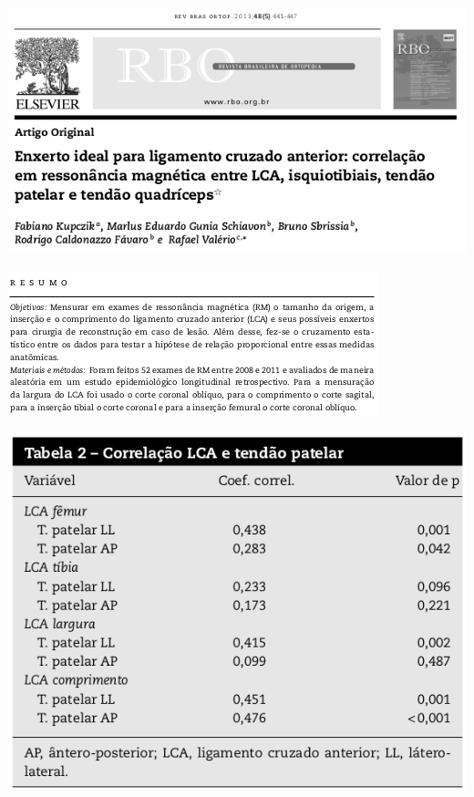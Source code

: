 \documentclass{beamer}
\begin{document}
\begin{frame}
  \begin{center}
    \includegraphics[width=\textwidth]{EDA/eda-exercicio1}
  \end{center}
\end{frame}

\begin{frame}
  \begin{center}
    \includegraphics[width=\textwidth]{EDA/eda-exercicio2}
  \end{center}
\end{frame}

\begin{frame}
  \begin{center}
    \includegraphics[height=.9\textheight]{EDA/eda-exercicio3}
  \end{center}
\end{frame}
\end{document}
